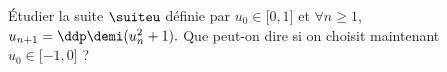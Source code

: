 
\begin{exercice} \;
\'Etudier la suite $\suiteu$ d\'efinie par $u_0\in\lbrack 0,1\rbrack$ et $\forall n \geq 1$, $u_{n+1}=\ddp\demi(u_n^2+1).$
\noindent Que peut-on dire si on choisit maintenant $u_0\in\lbrack -1,0\rbrack$ ?
\end{exercice}